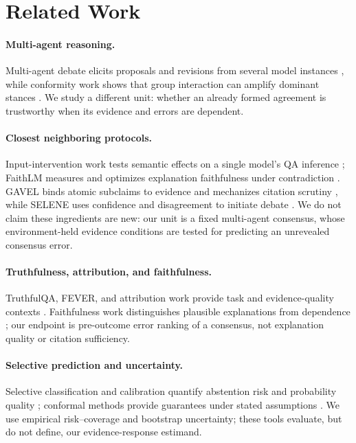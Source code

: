 \documentclass[11pt]{article}
\begin{document}
\section{Related Work}

\paragraph{Multi-agent reasoning.}
Multi-agent debate elicits proposals and revisions from several model instances \citep{du2023multiagent,liang2023divergent}, while conformity work shows that group interaction can amplify dominant stances \citep{choi2025conformity}. We study a different unit: whether an already formed agreement is trustworthy when its evidence and errors are dependent.

\paragraph{Closest neighboring protocols.}
Input-intervention work tests semantic effects on a single model's QA inference \citep{chaturvedi-etal-2024-analyzing}; FaithLM measures and optimizes explanation faithfulness under contradiction \citep{chuang-etal-2026-faithlm}. GAVEL binds atomic subclaims to evidence and mechanizes citation scrutiny \citep{xu-etal-2026-gavel}, while SELENE uses confidence and disagreement to initiate debate \citep{verma-etal-2026-selene}. We do not claim these ingredients are new: our unit is a fixed multi-agent consensus, whose environment-held evidence conditions are tested for predicting an unrevealed consensus error.

\paragraph{Truthfulness, attribution, and faithfulness.}
TruthfulQA, FEVER, and attribution work provide task and evidence-quality contexts \citep{lin2022truthfulqa,thorne2018fever,muller2023attribution}. Faithfulness work distinguishes plausible explanations from dependence \citep{jacovi2020faithfully,wiegreffe2019attention}; our endpoint is pre-outcome error ranking of a consensus, not explanation quality or citation sufficiency.

\paragraph{Selective prediction and uncertainty.}
Selective classification and calibration quantify abstention risk and probability quality \citep{geifman2017selective,guo2017calibration}; conformal methods provide guarantees under stated assumptions \citep{angelopoulos2021conformal}. We use empirical risk--coverage and bootstrap uncertainty; these tools evaluate, but do not define, our evidence-response estimand.
\end{document}
